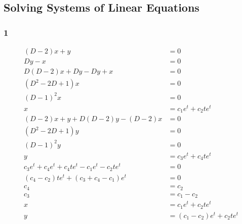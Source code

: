 \documentclass{article}
\begin{document}
\subsection{Solving Systems of Linear Equations}

\subsubsection{1}

\begin{align*}
  (D - 2) x + y                                       & = 0                           \\
  D y - x                                             & = 0                           \\
  D (D - 2) x + D y - D y + x                         & = 0                           \\
  (D^2 - 2D + 1) x                                    & = 0                           \\
  (D - 1)^2 x                                         & = 0                           \\
  x                                                   & = c_1 e^t + c_2 t e^t         \\
  (D - 2) x + y + D (D - 2) y - (D - 2) x             & = 0                           \\
  (D^2 - 2D + 1) y                                    & = 0                           \\
  (D - 1)^2 y                                         & = 0                           \\
  y                                                   & = c_3 e^t + c_4 t e^t         \\
  c_3 e^t + c_4 e^t + c_4 t e^t - c_1 e^t - c_2 t e^t & = 0                           \\
  (c_4 - c_2) t e^t + (c_3 + c_4 - c_1) e^t           & = 0                           \\
  c_4                                                 & = c_2                         \\
  c_3                                                 & = c_1 - c_2                   \\
  x                                                   & = c_1 e^t + c_2 t e^t         \\
  y                                                   & = (c_1 - c_2) e^t + c_2 t e^t
\end{align*}
\end{document}
